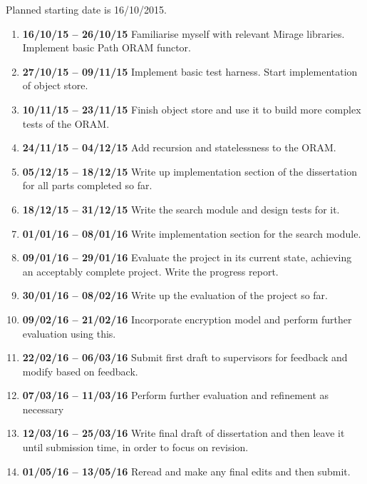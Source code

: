 \documentclass[12pt,a4paper,twoside]{article}
\begin{document}
Planned starting date is 16/10/2015.

\begin{enumerate}

\item {\bf 16/10/15 -- 26/10/15} Familiarise myself with relevant Mirage libraries. Implement basic Path ORAM functor.

\item {\bf 27/10/15 -- 09/11/15} Implement basic test harness. Start implementation of object store.

\item {\bf 10/11/15 -- 23/11/15} Finish object store and use it to build more complex tests of the ORAM.

\item {\bf 24/11/15 -- 04/12/15} Add recursion and statelessness to the ORAM.

\item {\bf 05/12/15 -- 18/12/15} Write up implementation section of the dissertation for all parts completed so far.

\item {\bf 18/12/15 -- 31/12/15} Write the search module and design tests for it.

\item {\bf 01/01/16 -- 08/01/16} Write implementation section for the search module.

\item {\bf 09/01/16 -- 29/01/16} Evaluate the project in its current state, achieving an acceptably complete project. Write the progress report.

\item {\bf 30/01/16 -- 08/02/16} Write up the evaluation of the project so far.

\item {\bf 09/02/16 -- 21/02/16} Incorporate encryption model and perform further evaluation using this.

\item {\bf 22/02/16 -- 06/03/16} Submit first draft to supervisors for feedback and modify based on feedback.

\item {\bf 07/03/16 -- 11/03/16} Perform further evaluation and refinement as necessary

\item {\bf 12/03/16 -- 25/03/16} Write final draft of dissertation and then leave it until submission time, in order to focus on revision.

\item {\bf 01/05/16 -- 13/05/16} Reread and make any final edits and then submit.

\end{enumerate}
\end{document}
